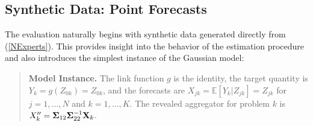 \documentclass[11pt]{article}
\newcommand{\E}{\mathbb{E}}
\theoremstyle{definition}
\theoremstyle{definition}
\def\bSigma{{\bf \Sigma}}
\def\X{{\bf X}}
\def\E{{\mathbb E}}
\begin{document}




\subsection{Synthetic Data: Point Forecasts}
\label{simulation}
The evaluation naturally begins with synthetic data generated directly from (\ref{NExperts}). This  provides insight into the behavior of the estimation procedure and also introduces the simplest instance of the Gaussian model:

\begin{quote}
{\bf Model Instance.}  The link function $g$ is the identity, the target quantity is $Y_k = g(Z_{0k}) = Z_{0k}$, and the forecasts are $X_{jk} = \E[Y_k | Z_{jk}] = Z_{jk}$ for $j = 1, \dots, N$ and $k = 1, \dots, K$. The revealed aggregator for problem $k$ is $X_k'' = \bSigma_{12} \bSigma_{22}^{-1} \X_k$. 
\end{quote}
\end{document}
